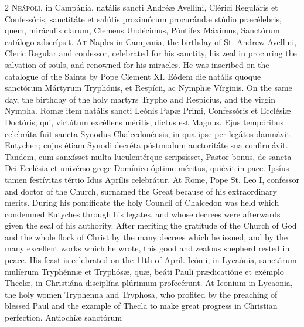 \begin{paracol}{2}
\lettrine[lines=2]{N}{eápoli,} in Campánia, natális sancti Andréæ Avellini, Clérici Reguláris et Confessóris, sanctitáte 
 et salútis proximórum procurándæ stúdio præcélebris, quem, miráculis clarum, 
 Clemens Undécimus, Póntifex Máximus, Sanctórum catálogo adscrípsit.
\switchcolumn
{}
\lettrine[lines=2]{A}{t} Naples in Campania, the birthday 
 of St. Andrew Avellini, Cleric Regular and confessor, celebrated for his 
 sanctity, his zeal in procuring the salvation of souls, and renowned for his 
 miracles. He was inscribed on the catalogue of the Saints by Pope 
 Clement XI.
\switchcolumn*
{}
Eódem die natális 
 quoque sanctórum Mártyrum Tryphónis, et Respícii, ac Nymphæ Vírginis.
\switchcolumn
{}
On the same day, the birthday of the 
 holy martyrs Trypho and Respicius, and the virgin Nympha.
\switchcolumn*
{}
Romæ item natális 
 sancti Leónis Papæ Primi, Confessóris et Ecclésiæ Doctóris; qui, virtútum 
 excéllens méritis, dictus est Magnus. Ejus tempóribus celebráta fuit 
 sancta Synodus Chalcedonénsis, in qua ipse per legátos damnávit Eutychen; 
 cujus étiam Synodi decréta póstmodum auctoritáte sua confirmávit. 
 Tandem, cum sanxísset multa luculentérque scripsísset, Pastor bonus, de 
 sancta Dei Ecclésia et univérso grege Domínico óptime méritus, quiévit in 
 pace. Ipsíus tamen festívitas tértio Idus Aprílis celebrátur.
\switchcolumn
{}
At Rome, Pope St. Leo I, confessor 
 and doctor of the Church, surnamed the Great because of his extraordinary 
 merits. During his pontificate the holy Council of Chalcedon was held 
 which condemned Eutyches through his legates, and whose decrees were 
 afterwards given the seal of his authority. After meriting the 
 gratitude of the Church of God and the whole flock of Christ by the many 
 decrees which he issued, and by the many excellent works which he wrote, 
 this good and zealous shepherd rested in peace. His feast is 
 celebrated on the 11th of April.
\switchcolumn*
{}
Icónii, in Lycaónia, 
 sanctárum mulíerum Tryphénnæ et Tryphósæ, quæ, beáti Pauli prædicatióne et 
 exémplo Theclæ, in Christiána disciplína plúrimum profecérunt.
\switchcolumn
{}
At Iconium in Lycaonia, the holy 
 women Tryphenna and Tryphosa, who profited by the preaching of blessed Paul 
 and the example of Thecla to make great progress in Christian perfection.
\switchcolumn*
{}
Antiochíæ sanctórum 

\end{paracol}
